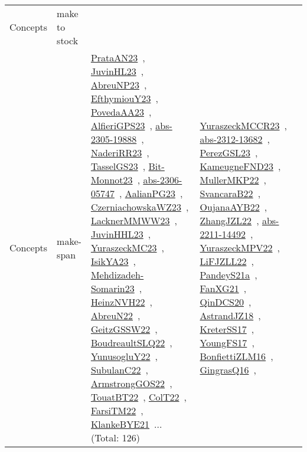 {\begin{longtable}{lp{3cm}>{\raggedright\arraybackslash}p{6cm}>{\raggedright\arraybackslash}p{6cm}>{\raggedright\arraybackslash}p{8cm}}
Concepts & make to stock &  &  & \\
Concepts & make-span & \href{works/PrataAN23.pdf}{PrataAN23}~\cite{PrataAN23}, \href{works/JuvinHL23.pdf}{JuvinHL23}~\cite{JuvinHL23}, \href{works/AbreuNP23.pdf}{AbreuNP23}~\cite{AbreuNP23}, \href{works/EfthymiouY23.pdf}{EfthymiouY23}~\cite{EfthymiouY23}, \href{works/PovedaAA23.pdf}{PovedaAA23}~\cite{PovedaAA23}, \href{works/AlfieriGPS23.pdf}{AlfieriGPS23}~\cite{AlfieriGPS23}, \href{works/abs-2305-19888.pdf}{abs-2305-19888}~\cite{abs-2305-19888}, \href{works/NaderiRR23.pdf}{NaderiRR23}~\cite{NaderiRR23}, \href{works/TasselGS23.pdf}{TasselGS23}~\cite{TasselGS23}, \href{works/Bit-Monnot23.pdf}{Bit-Monnot23}~\cite{Bit-Monnot23}, \href{works/abs-2306-05747.pdf}{abs-2306-05747}~\cite{abs-2306-05747}, \href{works/AalianPG23.pdf}{AalianPG23}~\cite{AalianPG23}, \href{works/CzerniachowskaWZ23.pdf}{CzerniachowskaWZ23}~\cite{CzerniachowskaWZ23}, \href{works/LacknerMMWW23.pdf}{LacknerMMWW23}~\cite{LacknerMMWW23}, \href{works/JuvinHHL23.pdf}{JuvinHHL23}~\cite{JuvinHHL23}, \href{works/YuraszeckMC23.pdf}{YuraszeckMC23}~\cite{YuraszeckMC23}, \href{works/IsikYA23.pdf}{IsikYA23}~\cite{IsikYA23}, \href{works/Mehdizadeh-Somarin23.pdf}{Mehdizadeh-Somarin23}~\cite{Mehdizadeh-Somarin23}, \href{works/HeinzNVH22.pdf}{HeinzNVH22}~\cite{HeinzNVH22}, \href{works/AbreuN22.pdf}{AbreuN22}~\cite{AbreuN22}, \href{works/GeitzGSSW22.pdf}{GeitzGSSW22}~\cite{GeitzGSSW22}, \href{works/BoudreaultSLQ22.pdf}{BoudreaultSLQ22}~\cite{BoudreaultSLQ22}, \href{works/YunusogluY22.pdf}{YunusogluY22}~\cite{YunusogluY22}, \href{works/SubulanC22.pdf}{SubulanC22}~\cite{SubulanC22}, \href{works/ArmstrongGOS22.pdf}{ArmstrongGOS22}~\cite{ArmstrongGOS22}, \href{works/TouatBT22.pdf}{TouatBT22}~\cite{TouatBT22}, \href{works/ColT22.pdf}{ColT22}~\cite{ColT22}, \href{works/FarsiTM22.pdf}{FarsiTM22}~\cite{FarsiTM22}, \href{works/KlankeBYE21.pdf}{KlankeBYE21}~\cite{KlankeBYE21}... (Total: 126) & \href{works/YuraszeckMCCR23.pdf}{YuraszeckMCCR23}~\cite{YuraszeckMCCR23}, \href{works/abs-2312-13682.pdf}{abs-2312-13682}~\cite{abs-2312-13682}, \href{works/PerezGSL23.pdf}{PerezGSL23}~\cite{PerezGSL23}, \href{works/KameugneFND23.pdf}{KameugneFND23}~\cite{KameugneFND23}, \href{works/MullerMKP22.pdf}{MullerMKP22}~\cite{MullerMKP22}, \href{works/SvancaraB22.pdf}{SvancaraB22}~\cite{SvancaraB22}, \href{works/OujanaAYB22.pdf}{OujanaAYB22}~\cite{OujanaAYB22}, \href{works/ZhangJZL22.pdf}{ZhangJZL22}~\cite{ZhangJZL22}, \href{works/abs-2211-14492.pdf}{abs-2211-14492}~\cite{abs-2211-14492}, \href{works/YuraszeckMPV22.pdf}{YuraszeckMPV22}~\cite{YuraszeckMPV22}, \href{works/LiFJZLL22.pdf}{LiFJZLL22}~\cite{LiFJZLL22}, \href{works/PandeyS21a.pdf}{PandeyS21a}~\cite{PandeyS21a}, \href{works/FanXG21.pdf}{FanXG21}~\cite{FanXG21}, \href{works/QinDCS20.pdf}{QinDCS20}~\cite{QinDCS20}, \href{works/AstrandJZ18.pdf}{AstrandJZ18}~\cite{AstrandJZ18}, \href{works/KreterSS17.pdf}{KreterSS17}~\cite{KreterSS17}, \href{works/YoungFS17.pdf}{YoungFS17}~\cite{YoungFS17}, \href{works/BonfiettiZLM16.pdf}{BonfiettiZLM16}~\cite{BonfiettiZLM16}, \href{works/GingrasQ16.pdf}{GingrasQ16}~\cite{GingrasQ16}, 
\end{longtable}}
